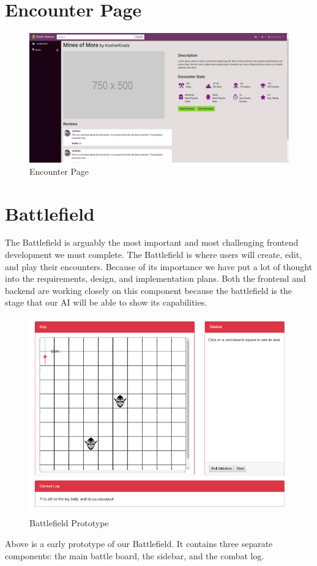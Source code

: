 \documentclass[12pt,a4paper]{report}
\begin{document}
	\section{Encounter Page}
	\begin{figure}[H]
		\centering
		\includegraphics[scale=.20]{encounter}
		\caption{Encounter Page}
		\label{fig: Encounter Page}
	\end{figure}

	\newpage
	\section{Battlefield}
	The Battlefield is arguably the most important and most challenging frontend development we must complete. The Battlefield is where users will create, edit, and play their encounters. Because of its importance we have put a lot of thought into the requirements, design, and implementation plans. Both the frontend and backend are working closely on this component because the battlefield is the stage that our AI will be able to show its capabilities.
	\begin{figure}[H]
		\centering
		\includegraphics[scale=.5]{encountercreator}
		\caption{Battlefield Prototype}
		\label{fig: Battlefield Prototype}
	\end{figure}
	Above is a early prototype of our Battlefield. It contains three separate components: the main battle board, the sidebar, and the combat log. 
\end{document}
